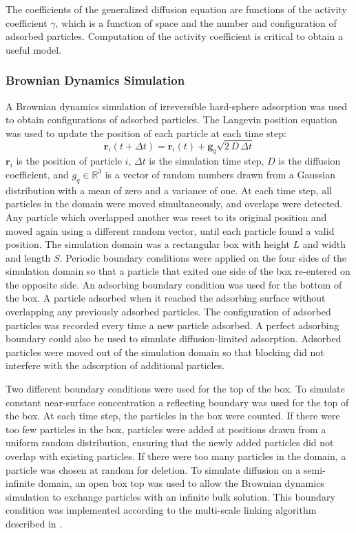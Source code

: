 The coefficients of the generalized diffusion equation are functions
of the activity coefficient $\gamma$, which is a function of space
and the number and configuration of adsorbed particles. Computation
of the activity coefficient is critical to obtain a useful model. 


\subsubsection{Brownian Dynamics Simulation}

A Brownian dynamics simulation of irreversible hard-sphere adsorption
was used to obtain configurations of adsorbed particles. The Langevin
position equation \cite{Elimelech1998} was used to update the position
of each particle at each time step: \[
\mathbf{r}_{i}(t+\Delta t)=\mathbf{r}_{i}(t)+\mathbf{g}_{q}\sqrt{2\, D\,\Delta t}\]
$\mathbf{r}_{i}$ is the position of particle $i$, $\Delta t$ is
the simulation time step, $D$ is the diffusion coefficient, and $g_{q}\in\mathbb{R}^{3}$
is a vector of random numbers drawn from a Gaussian distribution with
a mean of zero and a variance of one. At each time step, all particles
in the domain were moved simultaneously, and overlaps were detected.
Any particle which overlapped another was reset to its original position
and moved again using a different random vector, until each particle
found a valid position. The simulation domain was a rectangular box
with height $L$ and width and length $S$. Periodic boundary conditions
were applied on the four sides of the simulation domain so that a
particle that exited one side of the box re-entered on the opposite
side. An adsorbing boundary condition was used for the bottom of the
box. A particle adsorbed when it reached the adsorbing surface without
overlapping any previously adsorbed particles. The configuration of
adsorbed particles was recorded every time a new particle adsorbed.
A perfect adsorbing boundary could also be used to simulate diffusion-limited
adsorption. Adsorbed particles were moved out of the simulation domain
so that blocking did not interfere with the adsorption of additional
particles. 

Two different boundary conditions were used for the top of the box.
To simulate constant near-surface concentration a reflecting boundary
was used for the top of the box. At each time step, the particles
in the box were counted. If there were too few particles in the box,
particles were added at positions drawn from a uniform random distribution,
ensuring that the newly added particles did not overlap with existing
particles. If there were too many particles in the domain, a particle
was chosen at random for deletion. To simulate diffusion on a semi-infinite
domain, an open box top was used to allow the Brownian dynamics simulation
to exchange particles with an infinite bulk solution. This boundary
condition was implemented according to the multi-scale linking algorithm
described in \cite{Magan2004}. 


